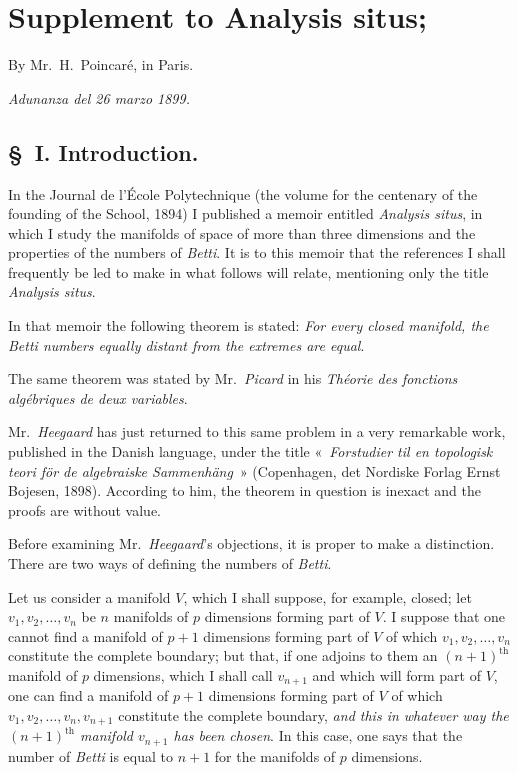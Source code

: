 \documentclass{article}
\begin{document}
\section*{Supplement to Analysis situs;}

By Mr.~H.~Poincaré, in Paris.

\emph{Adunanza del 26 marzo 1899.}

\subsection*{\S~I. Introduction.}

In the Journal de l'École Polytechnique (the volume for the centenary of the founding of the School, 1894) I published a memoir entitled \emph{Analysis situs}, in which I study the manifolds of space of more than three dimensions and the properties of the numbers of \emph{Betti}. It is to this memoir that the references I shall frequently be led to make in what follows will relate, mentioning only the title \emph{Analysis situs}.

In that memoir the following theorem is stated: \emph{For every closed manifold, the Betti numbers equally distant from the extremes are equal}.

The same theorem was stated by Mr.~\emph{Picard} in his \emph{Théorie des fonctions algébriques de deux variables}.

Mr.~\emph{Heegaard} has just returned to this same problem in a very remarkable work, published in the Danish language, under the title «~\emph{Forstudier til en topologisk teori för de algebraiske Sammenhäng}~» (Copenhagen, det Nordiske Forlag Ernst Bojesen, 1898). According to him, the theorem in question is inexact and the proofs are without value.


Before examining Mr.~\emph{Heegaard}'s objections, it is proper to make a distinction. There are two ways of defining the numbers of \emph{Betti}.

Let us consider a manifold $V$, which I shall suppose, for example, closed; let $v_{1}, v_{2}, \ldots, v_{n}$ be $n$ manifolds of $p$ dimensions forming part of $V$. I suppose that one cannot find a manifold of $p+1$ dimensions forming part of $V$ of which $v_{1}, v_{2}, \ldots, v_{n}$ constitute the complete boundary; but that, if one adjoins to them an $(n+1)^{\text{th}}$ manifold of $p$ dimensions, which I shall call $v_{n+1}$ and which will form part of $V$, one can find a manifold of $p+1$ dimensions forming part of $V$ of which $v_{1}, v_{2}, \ldots, v_{n}, v_{n+1}$ constitute the complete boundary, \emph{and this in whatever way the $(n+1)^{\text{th}}$ manifold $v_{n+1}$ has been chosen}. In this case, one says that the number of \emph{Betti} is equal to $n+1$ for the manifolds of $p$ dimensions.
\end{document}
